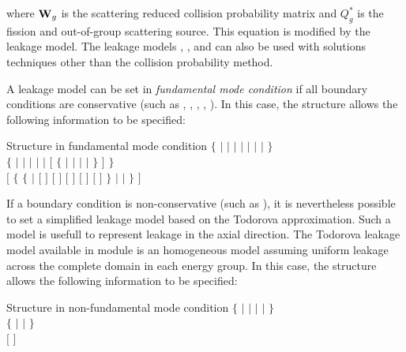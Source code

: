 \noindent where ${\bf W}_g$ is the scattering reduced collision probability matrix
and $ Q^{*}_g$ is the fission and out-of-group scattering source. This equation is
modified by the leakage model. The leakage models , , 
and  can also be used with solutions techniques other than the collision
probability method.

\vskip 0.2cm

A leakage model can be set in {\sl fundamental mode condition} if all boundary conditions are
conservative (such as , , , , ). In this
case, the  structure allows the following information to be specified:

\begin{DataStructure}{Structure  in fundamental mode condition}
$\{$  $|$  $|$  $|$  $|$  $|$  $|$  $|$  $\}$ \\
$\{$  $|$  $|$  $|$  $|$  $|$ 
$[$ $\{$  $|$  $|$  $|$  $|$  $\}$ $]$ $\}$ \\
$[$ $\{$  $\{$  $|$ $[$   $]$  
$[$   $]$ $[$   $]$ 
$[$   $]$
$[$   $]$ $\}$
$|$   $|$  $\}$
$]$  \end{DataStructure}

If a boundary condition is non-conservative (such as ), it is nevertheless possible to set a
simplified leakage model based on the Todorova approximation. Such a model is usefull to represent leakage in
the axial direction. The Todorova leakage model available in module  is an homogeneous model
assuming uniform leakage across the complete domain in each energy group. In this
case, the  structure allows the following information to be specified:

\begin{DataStructure}{Structure  in non-fundamental mode condition}
$\{$  $|$  $|$  $|$  $|$  $\}$ \\
$\{$  $|$  $|$  $\}$ \\
$[$   $]$ 
\end{DataStructure}


